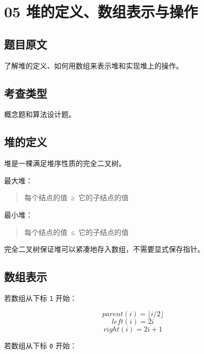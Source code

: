 \documentclass[UTF8,zihao=-4]{ctexart}
\begin{document}
\newpage

\section*{05 堆的定义、数组表示与操作}

\subsection*{题目原文}

了解堆的定义、如何用数组来表示堆和实现堆上的操作。

\subsection*{考查类型}

概念题和算法设计题。

\subsection*{堆的定义}

堆是一棵满足堆序性质的完全二叉树。

最大堆：

\begin{quote}
\small\ttfamily\raggedright
\relax 每个结点的值\ ≥\ 它的子结点的值\\
\end{quote}

最小堆：

\begin{quote}
\small\ttfamily\raggedright
\relax 每个结点的值\ ≤\ 它的子结点的值\\
\end{quote}

完全二叉树保证堆可以紧凑地存入数组，不需要显式保存指针。

\subsection*{数组表示}

若数组从下标 \texttt{1} 开始：

\[parent(i) = \lfloor i / 2 \rfloor\]
\[left(i) = 2i\]
\[right(i) = 2i + 1\]

若数组从下标 \texttt{0} 开始：
\end{document}
